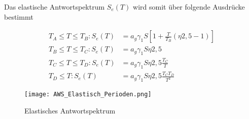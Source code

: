 Das elastische Antwortspektrum $S_e(T)$ wird somit über folgende Ausdrücke bestimmt

\begin{align*}
T_A \leq T \leq T_B: S_e(T) &= a_g\gamma_1S \left[ 1+\frac{T}{T_B}(\eta2,5-1) \right] \\
T_B \leq T \leq T_C: S_e(T) &= a_g\gamma_1S\eta2,5\\
T_C \leq T \leq T_D: S_e(T) &= a_g\gamma_1S\eta2,5\frac{T_C}{T}\\
T_D \leq T: S_e(T) &= a_g\gamma_1S\eta2,5\frac{T_CT_D}{T^2}
\end{align*}

\begin{figure}[H]
    \centering
    \texttt{[image: AWS\_Elastisch\_Perioden.png]}
    \caption{Elastisches Antwortspektrum}
\end{figure}

\pagebreak
